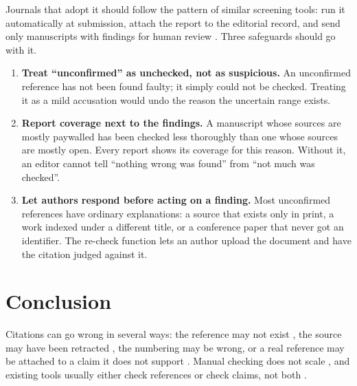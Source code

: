\documentclass{article}
\begin{document}
Journals that adopt it should follow the pattern of similar screening tools: run it automatically at submission, attach the report to the editorial record, and send only manuscripts with findings for human review \cite{nuijten2020,menke2020,weissgerber2021}. Three safeguards should go with it.

\begin{enumerate}
\item \textbf{Treat ``unconfirmed'' as unchecked, not as suspicious.} An unconfirmed reference has not been found faulty; it simply could not be checked. Treating it as a mild accusation would undo the reason the uncertain range exists.

\item \textbf{Report coverage next to the findings.} A manuscript whose sources are mostly paywalled has been checked less thoroughly than one whose sources are mostly open. Every report shows its coverage for this reason. Without it, an editor cannot tell ``nothing wrong was found'' from ``not much was checked''.

\item \textbf{Let authors respond before acting on a finding.} Most unconfirmed references have ordinary explanations: a source that exists only in print, a work indexed under a different title, or a conference paper that never got an identifier. The re-check function lets an author upload the document and have the citation judged against it.
\end{enumerate}


\section{Conclusion}
\label{sec:conclusion}

Citations can go wrong in several ways: the reference may not exist \cite{walters2023,bhattacharyya2023}, the source may have been retracted \cite{vannoorden2023,hsiao2021}, the numbering may be wrong, or a real reference may be attached to a claim it does not support \cite{jergas2015,smith2020}. Manual checking does not scale \cite{aczel2021}, and existing tools usually either check references or check claims, not both \cite{ref1,ref9}.
\end{document}
